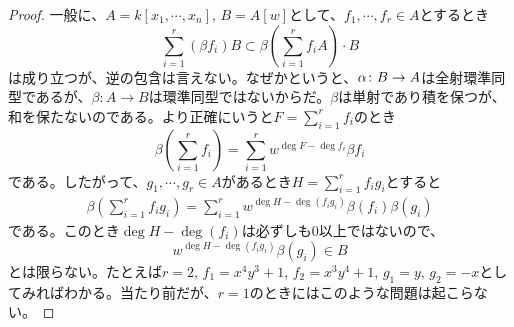 \begin{proof}
  一般に、$A = k[x_1, \cdots , x_n]$, $B = A[w]$として、$f_1, \cdots , f_r \in A$とするとき
  \[
  \sum_{i=1}^r (\beta f_i) B \subset \beta \left( \sum_{i=1}^r f_i A \right) \cdot B
  \]
  は成り立つが、逆の包含は言えない。なぜかというと、${\alpha} \colon B \to A$は全射環準同型であるが、$\beta \colon A \to B$は環準同型ではないからだ。$\beta$は単射であり積を保つが、和を保たないのである。より正確にいうと$F = \sum_{i=1}^r f_i$のとき
  \[
  \beta \left(\sum_{i=1}^r f_i \right) = \sum_{i=1}^r w^{\deg F - \deg f_i} \beta f_i
  \]
  である。したがって、$g_1, \cdots , g_r \in A$があるとき$H = \sum_{i=1}^r f_i g_i$とすると
  \begin{align*}
\beta \left( \sum_{i=1}^r f_i g_i \right) = \sum_{i=1}^r w^{\deg H - \deg (f_i g_i)} \beta(f_i)\beta( g_i)
  \end{align*}
  である。このとき$\deg H - \deg (f_i)$は必ずしも$0$以上ではないので、
  \[
 w^{\deg H - \deg (f_i g_i)} \beta( g_i) \in B
  \]
  とは限らない。たとえば$r=2$, $f_1 = x^4y^3 + 1$, $f_2 = x^3y^4 + 1$, $g_1 = y$, $g_2 = -x$としてみればわかる。当たり前だが、$r=1$のときにはこのような問題は起こらない。
\end{proof}



